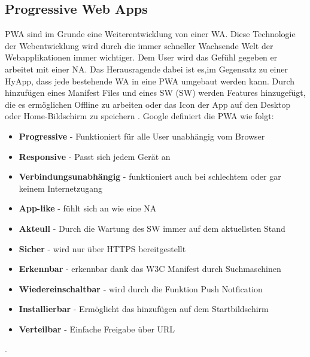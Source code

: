 \subsection{Progressive Web Apps}
\acl{PWA} sind im Grunde eine Weiterentwicklung von einer \acs{WA}. Diese Technologie der Webentwicklung wird durch die immer schneller Wachsende Welt der Webapplikationen immer wichtiger. 
Dem User wird das Gefühl gegeben er arbeitet mit einer \acs{NA}. Das Herausragende dabei ist es,im Gegensatz zu einer \acs{HyApp}, dass jede bestehende \acs{WA} in eine \acs{PWA} umgebaut werden kann.
Durch hinzufügen eines Manifest Files und eines \acl{SW} (\acs{SW}) werden Features hinzugefügt, die es ermöglichen Offline zu arbeiten oder das Icon der App auf den Desktop oder Home-Bildschirm zu speichern \cite{PWA}.
Google definiert die \acs{PWA} wie folgt:


\begin{itemize}
    \item  \textbf{Progressive} - Funktioniert für alle User unabhängig vom Browser
	\item  \textbf{Responsive} - Passt sich jedem Gerät an	
	\item  \textbf{Verbindungsunabhängig} - funktioniert auch bei schlechtem oder gar keinem Internetzugang
	\item  \textbf{App-like} - fühlt sich an wie eine \acs{NA}
	\item  \textbf{Akteull} - Durch die Wartung des \acs{SW} immer auf dem aktuellsten Stand
	\item  \textbf{Sicher} - wird nur über HTTPS bereitgestellt
	\item  \textbf{Erkennbar} - erkennbar dank das W3C Manifest durch Suchmaschinen
	\item  \textbf{Wiedereinschaltbar} - wird durch die Funktion Push Notfication
	\item  \textbf{Installierbar} - Ermöglicht das hinzufügen auf dem Startbildschirm
	\item  \textbf{Verteilbar } - Einfache Freigabe über URL \cite{PWAAdjectives}
\end{itemize}. 




\newpage

